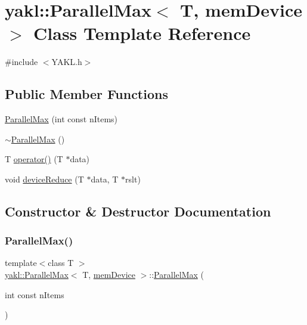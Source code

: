\hypertarget{classyakl_1_1ParallelMax_3_01T_00_01memDevice_01_4}{}\section{yakl\+:\+:Parallel\+Max$<$ T, mem\+Device $>$ Class Template Reference}
\label{classyakl_1_1ParallelMax_3_01T_00_01memDevice_01_4}


{\ttfamily \#include $<$Y\+A\+K\+L.\+h$>$}

\subsection*{Public Member Functions}
\begin{DoxyCompactItemize}
\item 
\hyperlink{classyakl_1_1ParallelMax_3_01T_00_01memDevice_01_4_aab8c21fb8cfaf6a71819e25061f66f75}{Parallel\+Max} (int const n\+Items)
\item 
\hyperlink{classyakl_1_1ParallelMax_3_01T_00_01memDevice_01_4_a9ffde9ce8c71aa9446324d22a9ab2520}{$\sim$\+Parallel\+Max} ()
\item 
T \hyperlink{classyakl_1_1ParallelMax_3_01T_00_01memDevice_01_4_a8cef2b628c4131ead6e82735b73ee1f4}{operator()} (T $\ast$data)
\item 
void \hyperlink{classyakl_1_1ParallelMax_3_01T_00_01memDevice_01_4_ab09a0a3b10fabaf81acaeb4c7b1348b2}{device\+Reduce} (T $\ast$data, T $\ast$rslt)
\end{DoxyCompactItemize}


\subsection{Constructor \& Destructor Documentation}
\mbox{\label{classyakl_1_1ParallelMax_3_01T_00_01memDevice_01_4_aab8c21fb8cfaf6a71819e25061f66f75}} 
\subsubsection{\texorpdfstring{Parallel\+Max()}{ParallelMax()}}
{\footnotesize\ttfamily template$<$class T $>$ \\
\hyperlink{classyakl_1_1ParallelMax}{yakl\+::\+Parallel\+Max}$<$ T, \hyperlink{namespaceyakl_ac3c32aec58c61e7f870081477ceee883}{mem\+Device} $>$\+::\hyperlink{classyakl_1_1ParallelMax}{Parallel\+Max} (\begin{DoxyParamCaption}\item[{int const}]{n\+Items }\end{DoxyParamCaption})\hspace{0.3cm}{\ttfamily [inline]}}


